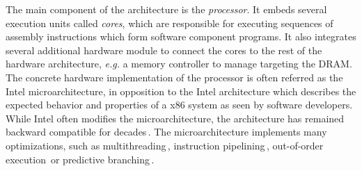 The main component of the architecture is the \emph{processor}.
%
It embeds several execution units called \emph{cores}, which are
responsible for executing sequences of assembly instructions which form
software component programs.
%
It also integrates several additional hardware module to connect the cores to
the rest of the hardware architecture, \emph{e.g.} a memory controller to manage
\IOs targeting the DRAM.
%
The concrete hardware implementation of the processor is often referred as the
Intel microarchitecture, in opposition to the Intel architecture which describes
the expected behavior and properties of a x86 system as seen by software
developers.
%
While Intel often modifies the microarchitecture, the architecture has remained
backward compatible for decades\,\cite{turley2014introx86}.
%
The microarchitecture implements many optimizations, such as
multithreading\,\cite{marr2002hypertheading}, instruction
pipelining\,\cite{fog2012microarchitecture}, out-of-order
execution\,\cite[Section 2]{fog2012microarchitecture} or predictive
branching\,\cite{milenkovic2002branchprediction}\cite[Section
3]{fog2012microarchitecture}.
%
%
